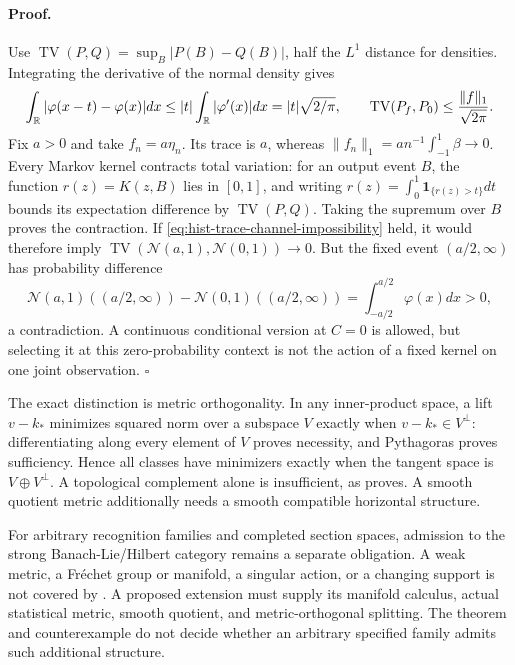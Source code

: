 \paragraph{Proof.}
Use
\(\operatorname{TV}(P,Q)=\sup_B|P(B)-Q(B)|\), half the \(L^1\) distance
for densities. Integrating the derivative of the normal density gives
\begin{equation}
\int_\mathbb R|\varphi(x-t)-\varphi(x)|dx
\leq |t|\int_\mathbb R|\varphi'(x)|dx
=|t|\sqrt{2/\pi},
\qquad
\operatorname{TV}(P_f,P_0)\leq\frac{\|f\|_1}{\sqrt{2\pi}}.
\label{eq:hist-trace-total-variation-bound}
\end{equation}
Fix \(a>0\) and take \(f_n=a\eta_n\). Its trace is \(a\), whereas
\(\|f_n\|_1=a n^{-1}\int_{-1}^1\beta\to0\).
Every Markov kernel contracts total variation: for an output event \(B\),
the function \(r(z)=K(z,B)\) lies in \([0,1]\), and writing
\(r(z)=\int_0^1\mathbf1_{\{r(z)>t\}}dt\) bounds its expectation difference
by \(\operatorname{TV}(P,Q)\). Taking the supremum over \(B\) proves
the contraction. If \eqref{eq:hist-trace-channel-impossibility} held,
it would therefore imply
\(\operatorname{TV}(\mathcal N(a,1),\mathcal N(0,1))\to0\).
But the fixed event \((a/2,\infty)\) has probability difference
\begin{equation}
\mathcal N(a,1)((a/2,\infty))
-\mathcal N(0,1)((a/2,\infty))
=\int_{-a/2}^{a/2}\varphi(x)dx>0,
\label{eq:hist-trace-output-separation}
\end{equation}
a contradiction. A continuous conditional version at \(C=0\) is allowed,
but selecting it at this zero-probability context is not the action of a
fixed kernel on one joint observation. \(\square\)

The exact distinction is metric orthogonality. In any inner-product space,
a lift \(v-k_*\) minimizes squared norm over a subspace \(V\) exactly when
\(v-k_*\in V^\perp\): differentiating along every element of \(V\)
proves necessity, and Pythagoras proves sufficiency. Hence all classes have
minimizers exactly when the tangent space is \(V\oplus V^\perp\).
A topological complement alone is insufficient, as
 proves.
A smooth quotient metric additionally needs a smooth compatible horizontal
structure. 

For arbitrary recognition families and completed section spaces,
admission to the strong Banach-Lie/Hilbert category remains a separate
obligation. A weak metric, a Fr\'echet group or manifold, a singular action,
or a changing support is not covered by
. A proposed extension must supply
its manifold calculus, actual statistical metric, smooth quotient, and
metric-orthogonal splitting. The theorem and counterexample do not decide
whether an arbitrary specified family admits such additional structure.

